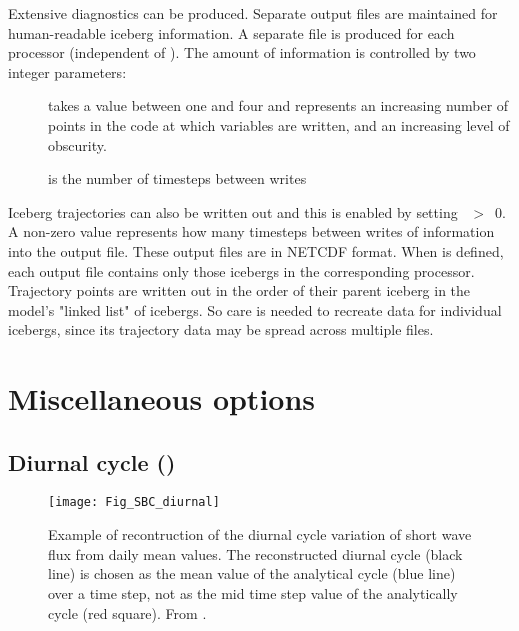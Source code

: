 \documentclass[NEMO_book]{subfiles}
\begin{document}
Extensive diagnostics can be produced.
Separate output files are maintained for human-readable iceberg information.
A separate file is produced for each processor (independent of ).
The amount of information is controlled by two integer parameters:
\begin{description}
\item[]  takes a value between one and four and represents 
an increasing number of points in the code at which variables are written, and an 
increasing level of obscurity.
\item[] is the number of timesteps between writes
\end{description}

Iceberg trajectories can also be written out and this is enabled by setting ~$>$~0.
A non-zero value represents how many timesteps between writes of information into the output file.
These output files are in NETCDF format.
When  is defined, each output file contains only those icebergs in the corresponding processor.
Trajectory points are written out in the order of their parent iceberg in the model's "linked list" of icebergs.
So care is needed to recreate data for individual icebergs, since its trajectory data may be spread across
multiple files.


\section{Miscellaneous options}
\label{SBC_misc}

\subsection   [Diurnal  cycle (\textit{sbcdcy})]
			{Diurnal cycle ()}
\label{SBC_dcy}

\begin{figure}[!t]    \begin{center}
\texttt{[image: Fig\_SBC\_diurnal]}
\caption{ \label{Fig_SBC_diurnal}    
Example of recontruction of the diurnal cycle variation of short wave flux  
from daily mean values. The reconstructed diurnal cycle (black line) is chosen 
as the mean value of the analytical cycle (blue line) over a time step, not 
as the mid time step value of the analytically cycle (red square). From \citet{Bernie_al_CD07}.}
\end{center}   \end{figure}
\end{document}
